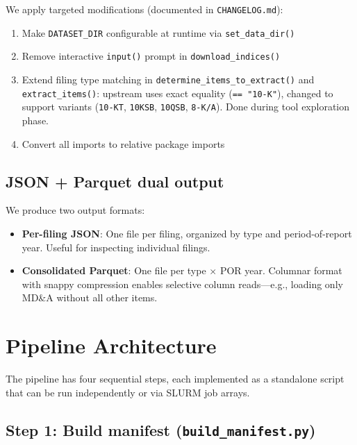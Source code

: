 \documentclass[11pt]{article}
\begin{document}
We apply targeted modifications (documented in \texttt{CHANGELOG.md}):
\begin{enumerate}
  \item Make \texttt{DATASET\_DIR} configurable at runtime via \texttt{set\_data\_dir()}
  \item Remove interactive \texttt{input()} prompt in \texttt{download\_indices()}
  \item Extend filing type matching in \texttt{determine\_items\_to\_extract()} and \texttt{extract\_items()}: upstream uses exact equality (\texttt{== "10-K"}), changed to support variants (\texttt{10-KT}, \texttt{10KSB}, \texttt{10QSB}, \texttt{8-K/A}). Done during tool exploration phase.
  \item Convert all imports to relative package imports
\end{enumerate}

\subsection{JSON + Parquet dual output}

We produce two output formats:

\begin{itemize}
  \item \textbf{Per-filing JSON}: One file per filing, organized by type and period-of-report year. Useful for inspecting individual filings.
  \item \textbf{Consolidated Parquet}: One file per type $\times$ POR year. Columnar format with snappy compression enables selective column reads---e.g., loading only MD\&A without all other items.
\end{itemize}

\section{Pipeline Architecture}

The pipeline has four sequential steps, each implemented as a standalone script that can be run independently or via SLURM job arrays.

\subsection{Step 1: Build manifest (\texttt{build\_manifest.py})}
\end{document}
